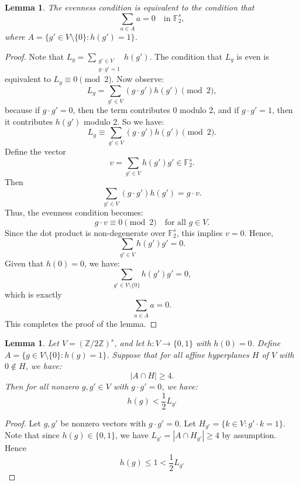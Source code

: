 \documentclass[12pt,twoside,]{amsart}
\theoremstyle{plain}
\newtheorem{lemma}[theorem]{Lemma}
\theoremstyle{definition}
\begin{document}
\begin{lemma}\label{evenness condition}
    The evenness condition is equivalent to the condition that
\[
\sum_{a \in A} a = 0 \quad \text{in } \mathbb{F}_2^s,
\]
where \( A = \{ g' \in V \setminus \{0\} : h(g') = 1 \} \).
\end{lemma}

\begin{proof}
Note that \( L_g = \sum_{\substack{g' \in V \\ g \cdot g' = 1}} h(g') \). The condition that \( L_g \) is even is equivalent to \( L_g \equiv 0 \pmod{2} \). Now observe:
\[
L_g = \sum_{g' \in V} (g \cdot g') h(g') \pmod{2},
\]
because if \( g \cdot g' = 0 \), then the term contributes 0 modulo 2, and if \( g \cdot g' = 1 \), then it contributes \( h(g') \) modulo 2. So we have:
\[
L_g \equiv \sum_{g' \in V} (g \cdot g') h(g') \pmod{2}.
\]
Define the vector
\[
v = \sum_{g' \in V} h(g') g' \in \mathbb{F}_2^s.
\]
Then
\[
\sum_{g' \in V} (g \cdot g') h(g') = g \cdot v.
\]
Thus, the evenness condition becomes:
\[
g \cdot v \equiv 0 \pmod{2} \quad \text{for all } g \in V.
\]
Since the dot product is non-degenerate over \( \mathbb{F}_2^s \), this implies \( v = 0 \). Hence,
\[
\sum_{g' \in V} h(g') g' = 0.
\]
Given that \( h(0) = 0 \), we have:
\[
\sum_{g' \in V \setminus \{0\}} h(g') g' = 0,
\]
which is exactly
\[
\sum_{a \in A} a = 0.
\]
This completes the proof of the lemma.
\end{proof}

\begin{lemma}\label{intersection with affine hyperplanes}
Let $V = (\mathbb{Z}/2\mathbb{Z})^s$, and let $h: V \to \{0,1\}$ with $h(0) = 0$.
Define 
$A = \{g \in V \setminus \{0\} : h(g) = 1\}$. Suppose that for all affine hyperplanes $H$ of $V$ with $0 \notin H$, we have:
    \[
    |A \cap H| \geq 4.
    \]
Then for all nonzero $g, g' \in V$ with $g \cdot g' = 0$, we have:
    \[
    h(g) < \frac{1}{2} L_{g'}
    \]
    
\end{lemma}

\begin{proof}
Let $g, g'$ be nonzero vectors with $g \cdot g' = 0$. Let $H_{g'} = \{k \in V : g' \cdot k = 1\}$.
Note that since $h(g) \in \{0,1\}$, we have $L_{g'} = |A \cap H_{g'}| \geq 4$ by assumption. Hence
\[
 h(g) \leq 1 < \frac{1}{2} L_{g'} 
\]


\end{proof}
\end{document}
